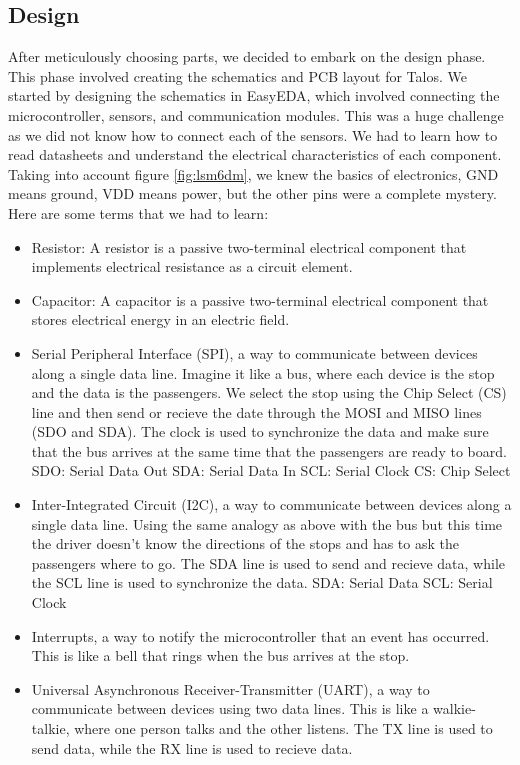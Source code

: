 \documentclass{article}
\begin{document}
\subsection{Design}
After meticulously choosing parts, we decided to embark on the design phase. This phase involved creating the schematics and PCB layout for Talos. We started by designing the schematics in EasyEDA, which involved connecting the microcontroller, sensors, and communication modules. This was a huge challenge as we did not know how to connect each of the sensors. We had to learn how to read datasheets and understand the electrical characteristics of each component. Taking into account figure \ref{fig:lsm6dm}, we knew the basics of electronics, GND means ground, VDD means power, but the other pins were a complete mystery. Here are some terms that we had to learn:
\begin{itemize}
      \item Resistor: A resistor is a passive two-terminal electrical component that implements electrical resistance as a circuit element.
      \item Capacitor: A capacitor is a passive two-terminal electrical component that stores electrical energy in an electric field.
      \item Serial Peripheral Interface (SPI), a way to communicate between devices along a single data line. Imagine it like a bus, where each device is the stop and the data is the passengers. We select the stop using the Chip Select (CS) line and then send or recieve the date through the MOSI and MISO lines (SDO and SDA). The clock is used to synchronize the data and make sure that the bus arrives at the same time that the passengers are ready to board.
            \subitem SDO: Serial Data Out
            \subitem SDA: Serial Data In
            \subitem SCL: Serial Clock
            \subitem CS: Chip Select
      \item Inter-Integrated Circuit (I2C), a way to communicate between devices along a single data line. Using the same analogy as above with the bus but this time the driver doesn't know the directions of the stops and has to ask the passengers where to go. The SDA line is used to send and recieve data, while the SCL line is used to synchronize the data.
            \subitem SDA: Serial Data
            \subitem SCL: Serial Clock
      \item Interrupts, a way to notify the microcontroller that an event has occurred. This is like a bell that rings when the bus arrives at the stop.
      \item Universal Asynchronous Receiver-Transmitter (UART), a way to communicate between devices using two data lines. This is like a walkie-talkie, where one person talks and the other listens. The TX line is used to send data, while the RX line is used to recieve data.

\end{itemize}
\end{document}
